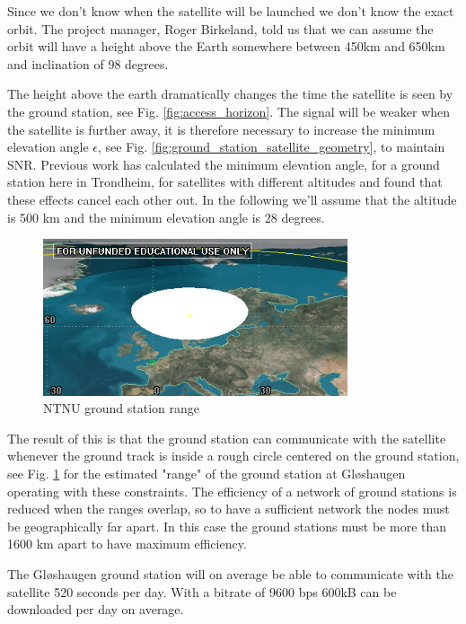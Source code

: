 Since we don't know when the satellite will be launched we don't know the exact orbit. The project manager, Roger Birkeland, told us that we can assume the orbit will  have a height above the Earth somewhere between 450km and 650km and inclination of 98 degrees.

The height above the earth dramatically changes the time the satellite is seen by the ground station, see Fig. \ref{fig:access_horizon}. The signal will be weaker when the satellite is further away, it is therefore necessary to increase the minimum elevation angle $\epsilon$, see Fig. \ref{fig:ground_station_satellite_geometry}, to maintain SNR.  Previous work\cite{antennemaster,bildemaster} has calculated the minimum elevation angle, for a ground station here in Trondheim, for satellites with different altitudes and found that these effects cancel each other out. In the following we'll assume that the altitude is 500 km and the minimum elevation angle is 28 degrees.

\begin{figure}
  \begin{center}
    \includegraphics[width=0.8\textwidth]{Figures/ntnu_footprint}
  \end{center}
  \caption[ntnu footprint]{NTNU ground station range}
  \label{fig:ntnu_range}
\end{figure}

The result of this is that the ground station can communicate with the satellite whenever the ground track is inside a rough circle centered on the ground station, see Fig. \ref{fig:ntnu_range} for the estimated "range" of the ground station at Gløshaugen operating with these constraints. The efficiency of a network of ground stations is reduced when the ranges overlap, so to have a sufficient network the nodes must be geographically far apart. In this case the ground stations must be more than 1600 km apart to have maximum efficiency.

The Gløshaugen ground station will on average be able to communicate with the satellite 520 seconds per day. With a bitrate of 9600 bps 600kB can be downloaded per day on average.

